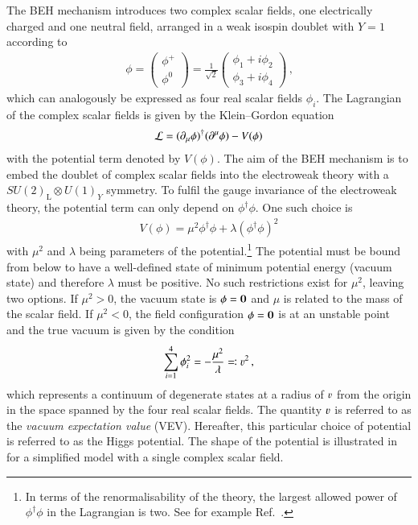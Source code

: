 The BEH mechanism introduces two complex scalar fields, one electrically charged
and one neutral field, arranged in a weak isospin doublet with $Y = 1$ according
to
\begin{align*}
  \phi =
  \begin{pmatrix}
    \phi^+ \\
    \phi^0
  \end{pmatrix}
  = \frac{1}{\sqrt{2}}
  \begin{pmatrix}
    \phi_1 + i \phi_2 \\
    \phi_3 + i \phi_4
  \end{pmatrix} \,\text{,}
\end{align*}
which can analogously be expressed as four real scalar fields $\phi_i$. The
Lagrangian of the complex scalar fields is given by the Klein--Gordon equation
\begin{align*}
  \mathcal{L} = (\partial_\mu \phi)^\dagger (\partial^\mu \phi) - V(\phi)
\end{align*}
with the potential term denoted by $V(\phi)$. The aim of the BEH mechanism is to
embed the doublet of complex scalar fields into the electroweak theory with a
$SU(2)_{\text{L}}\otimes U(1)_Y$ symmetry. To fulfil the gauge invariance of the
electroweak theory, the potential term can only depend on $\phi^\dagger
\phi$. One such choice is
\begin{align}
  V(\phi) = \mu^2 \phi^\dagger \phi + \lambda (\phi^\dagger \phi)^2
  \label{eq:higgs_potential}
\end{align}
with $\mu^2$ and $\lambda$ being parameters of the potential.\footnote{In terms
  of the renormalisability of the theory, the largest allowed power of
  $\phi^\dagger \phi$ in the Lagrangian is two. See for example
  Ref.~\cite{Peskin:1995ev}.} The potential must be bound from below to have a
well-defined state of minimum potential energy (vacuum state) and therefore
$\lambda$ must be positive. No such restrictions exist for $\mu^2$, leaving two
options. If $\mu^2 > 0$, the vacuum state is $\phi = \bm{0}$ and $\mu$ is
related to the mass of the scalar field. If $\mu^2 < 0$, the field configuration
$\phi = \bm{0}$ is at an unstable point and the true vacuum is given by the
condition
\begin{align*}
  \sum_{i = 1}^4 \phi_i^2 = -\frac{\mu^2}{\lambda} \eqqcolon \varv^2 \,\text{,}
\end{align*}
which represents a continuum of degenerate states at a radius of $\varv$ from
the origin in the space spanned by the four real scalar fields. The quantity
$\varv$ is referred to as the \emph{vacuum expectation value} (VEV). Hereafter,
this particular choice of potential is referred to as the Higgs potential. The
shape of the potential is illustrated in  for a simplified
model with a single complex scalar field.

